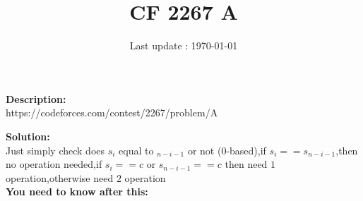 \documentclass{article}
\begin{document}
\title{\textbf{CF 2267 A}}
\author{}
\date{Last update : \today}

\maketitle

\noindent \textbf{Description:}\\
https://codeforces.com/contest/2267/problem/A

\noindent \textbf{Solution:}\\
Just simply check does $s_i$ equal to $_{n-i-1}$ or not (0-based),if $s_i==s_{n-i-1}$,then no operation needed,if $s_i==c$ or $s_{n-i-1}==c$ then need $1$ operation,otherwise need $2$ operation
\\
\noindent \textbf{You need to know after this:}\\
\end{document}
